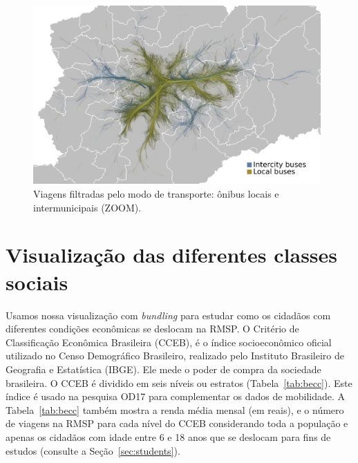 \begin{figure}[!htb]
  \centering
  \captionsetup{justification=centering}
  \includegraphics[width=0.98\textwidth]{../figuras/local-intercity-buses}
  \caption{Viagens filtradas pelo modo de transporte: ônibus locais e intermunicipais (ZOOM). \label{fig:bus-integration-zoom}}
\end{figure}

\section{Visualização das diferentes classes sociais}
\label{sec:strata}

Usamos nossa visualização com \emph{bundling} para estudar como os cidadãos com diferentes
condições econômicas se deslocam na RMSP. O Critério de Classificação Econômica
Brasileira (CCEB), \cite{cceb2008} é o índice socioeconômico oficial utilizado no Censo
Demográfico Brasileiro, realizado pelo Instituto Brasileiro de Geografia e
Estatística (IBGE). Ele mede o poder de compra da sociedade brasileira. O CCEB é
dividido em seis níveis ou estratos (Tabela~\ref{tab:becc}). Este índice é usado na pesquisa
OD17 para complementar os dados de mobilidade. A Tabela~\ref{tab:becc} também mostra a renda
média mensal (em reais), e o número de viagens na RMSP para cada nível do CCEB considerando toda a população e apenas
os cidadãos com idade entre 6 e 18 anos que se deslocam para fins de estudos (consulte a
Seção~\ref{sec:students}).

